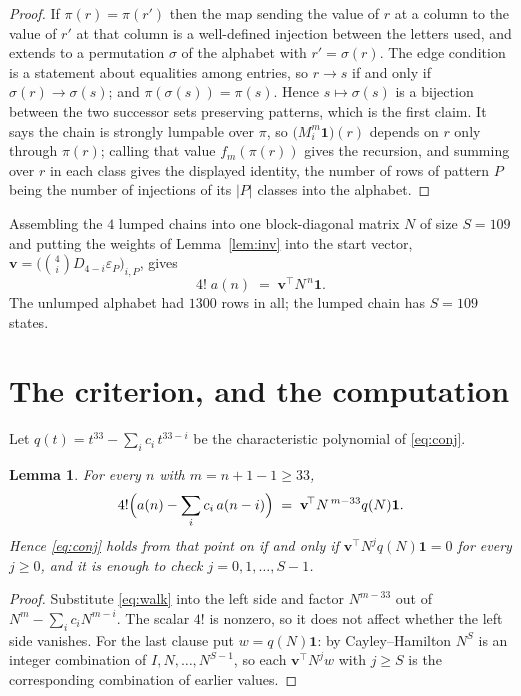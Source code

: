 \documentclass[11pt,a4paper]{article}
\theoremstyle{plain}
\newtheorem{lemma}[theorem]{Lemma}
\theoremstyle{definition}
\begin{document}
\begin{proof}
If $\pi(r)=\pi(r')$ then the map sending the value of $r$ at a column to the value of $r'$
at that column is a well-defined injection between the letters used, and extends to a
permutation $\sigma$ of the alphabet with $r'=\sigma(r)$. The edge condition is a statement
about equalities among entries, so $r\to s$ if and only if $\sigma(r)\to\sigma(s)$; and
$\pi(\sigma(s))=\pi(s)$. Hence $s\mapsto\sigma(s)$ is a bijection between the two successor
sets preserving patterns, which is the first claim. It says the chain is strongly lumpable
over $\pi$, so $\bigl(M_i^{m}\mathbf{1}\bigr)(r)$ depends on $r$ only through $\pi(r)$;
calling that value $f_m(\pi(r))$ gives the recursion, and summing over $r$ in each class
gives the displayed identity, the number of rows of pattern $P$ being the number of
injections of its $|P|$ classes into the alphabet.
\end{proof}

Assembling the $4$ lumped chains into one block-diagonal matrix $N$ of size $S=109$ and
putting the weights of Lemma~\ref{lem:inv} into the start vector,
$\mathbf{v}=\bigl(\binom{4}{i}D_{4-i}\varepsilon_P\bigr)_{i,P}$, gives
\begin{equation}\label{eq:walk}
4!\;a(n)\;=\;\mathbf{v}^{\!\top}N^{\,n}\mathbf{1} .
\end{equation}
The unlumped alphabet had $1300$ rows in all; the lumped chain has $S=109$ states.

\section{The criterion, and the computation}

Let $q(t)=t^{33}-\sum_i c_i\,t^{33-i}$ be the characteristic polynomial of
\eqref{eq:conj}.

\begin{lemma}\label{lem:crit}
For every $n$ with $m=n+1-1\ge33$,
\[
4!\Bigl(a(n)-\sum_i c_i\,a(n-i)\Bigr)\;=\;\mathbf{v}^{\!\top}N^{\,m-33}q(N)\mathbf{1} .
\]
Hence \eqref{eq:conj} holds from that point on if and only if
$\mathbf{v}^{\!\top}N^{j}q(N)\mathbf{1}=0$ for every $j\ge0$, and it is enough to check
$j=0,1,\dots,S-1$.
\end{lemma}

\begin{proof}
Substitute \eqref{eq:walk} into the left side and factor $N^{m-33}$ out of
$N^{m}-\sum_i c_iN^{m-i}$. The scalar $4!$ is nonzero, so it does not affect whether
the left side vanishes. For the last clause put $w=q(N)\mathbf{1}$: by Cayley--Hamilton
$N^{S}$ is an integer combination of $I,N,\dots,N^{S-1}$, so each
$\mathbf{v}^{\!\top}N^{j}w$ with $j\ge S$ is the corresponding combination of earlier
values.
\end{proof}
\end{document}
